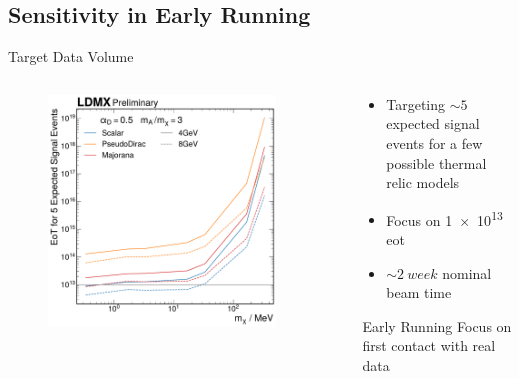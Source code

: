 \documentclass[aspectratio=169]{beamer}
\begin{document}

\subsection{Sensitivity in Early Running}
\begin{frame}{Target Data Volume}
  \begin{columns}
    \begin{column}{0.45\textwidth}
      \begin{figure}
        \centering
        \includegraphics[width=0.9\textwidth]{figs/eot-for-n-signal.pdf}
      \end{figure}
    \end{column}
    \begin{column}{0.55\textwidth}
      \begin{itemize}
        \item Targeting $\sim 5$ expected signal events for a few possible thermal relic models
        \item Focus on \num{1e13} \ac{eot}
        \item $\sim\qty{2}{week}$ nominal beam time
      \end{itemize}

      \begin{block}{Early Running}
        Focus on first contact with real data
      \end{block}
    \end{column}
  \end{columns}
\end{frame}
\end{document}
